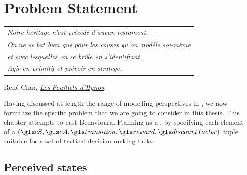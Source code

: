 
\graphicspath{{2-Chapters/3-Chapter/}}




\chapter{Problem Statement}
\label{chapter:3}

\begin{flushright}
	\begin{tabular}{@{}l@{}}
		\emph{Notre héritage n'est précédé d'aucun testament.}\\
		\emph{On ne se bat bien que pour les causes qu'on modèle soi-même}\\
		\emph{et avec lesquelles on se brûle en s'identifiant.}\\
		\emph{Agir en primitif et prévoir en stratège.}\\
	\end{tabular}
	
	René Char, \href{}{\emph{Les Feuillets d'Hynos}}.
\end{flushright}


\abstractStartChapter{}%
Having discussed at length the range of  modelling perspectives in , we now formalize the specific problem that we are going to consider in this thesis. This chapter attempts to cast Behavioural Planning as a , by specifying each element of a $(\cS, \cA, \Ps, \R, \discount)$ tuple suitable for a set of tactical decision-making tasks.
\minitocStartChapter{}

\section{Perceived states}

